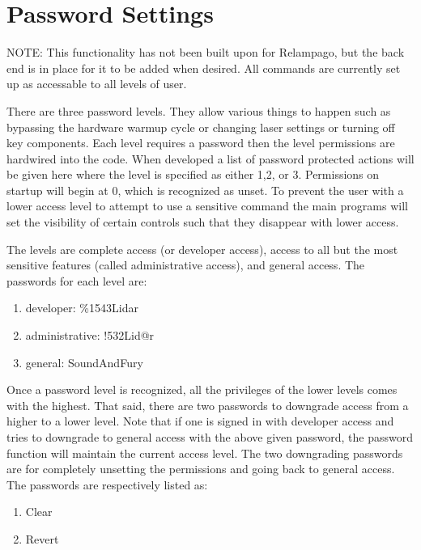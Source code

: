 \section{Password Settings} \label{Sec:Password}

NOTE: This functionality has not been built upon for Relampago, but the back end is in place for it to be added when desired. All commands are currently set up as accessable to all levels of user. 

There are three password levels. They allow various things to happen such as bypassing the hardware warmup cycle or changing laser settings or turning off key components. Each level requires a password then the level permissions are hardwired into the code. When developed a list of password protected actions will be given here where the level is specified as either 1,2, or 3. Permissions on startup will begin at 0, which is recognized as unset. To prevent the user with a lower access level to attempt to use a sensitive command the main programs will set the visibility of certain controls such that they disappear with lower access.

The levels are complete access (or developer access), access to all but the most sensitive features (called administrative access), and general access. The passwords for each level are:

\begin{enumerate}
\item{developer: \%1543Lidar}
\item{administrative: !532Lid@r}
\item{general: SoundAndFury}
\end{enumerate}

Once a password level is recognized, all the privileges of the lower levels comes with the highest. That said, there are two passwords to downgrade access from a higher to a lower level. Note that if one is signed in with developer access and tries to downgrade to general access with the above given password, the password function will maintain the current access level. The two downgrading passwords are for completely unsetting the permissions and going back to general access. The passwords are respectively listed as:

\begin{enumerate}
\item{Clear}
\item{Revert}
\end{enumerate}

